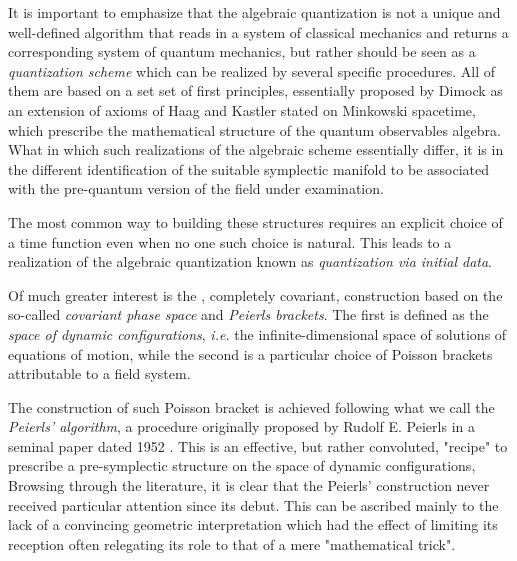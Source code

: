 \documentclass[Main]{subfiles}
\begin{document}
It is important to emphasize that the algebraic quantization is not a unique and well-defined algorithm that reads in a system of classical mechanics and returns a corresponding system of quantum mechanics, but rather should be seen as a \emph{quantization scheme} which can be realized by several specific procedures.
All of them are based on a set set of first principles, essentially proposed by Dimock \cite{Dimock1980} as an extension of axioms of Haag and Kastler stated on Minkowski spacetime, which prescribe the mathematical structure of the quantum observables algebra.
What in which such realizations of the algebraic scheme essentially differ, it is in the different identification of the suitable symplectic manifold  to be associated with the pre-quantum version of the field under examination.

The most common way to building these structures requires an explicit choice of a time function even when no one such choice is natural. 	This leads to a  realization of the algebraic quantization known as \emph{quantization via initial data}.
	
Of much greater interest is the , completely covariant, construction based on the so-called \emph{covariant phase space} and \emph{Peierls brackets}.
	The first is defined as the \emph{space of dynamic configurations}, \textit{i.e.}  the infinite-dimensional space of solutions of equations of motion, while the second is a particular choice of Poisson brackets attributable to a field system.
	
	The construction of such Poisson bracket is achieved following what we call the \emph{Peierls' algorithm}, a procedure originally proposed by Rudolf E. Peierls in a seminal paper dated 1952 \cite{Peierls1952}. 
	This is an effective, but rather convoluted, "recipe"  to prescribe a pre-symplectic structure on the space of dynamic configurations, 
	Browsing through the literature, it is clear that the Peierls' construction never received particular attention since its debut.
This can be ascribed mainly to the lack of a convincing geometric interpretation
which had the effect of limiting its reception often relegating its role to that of a mere  "mathematical trick".
\end{document}
